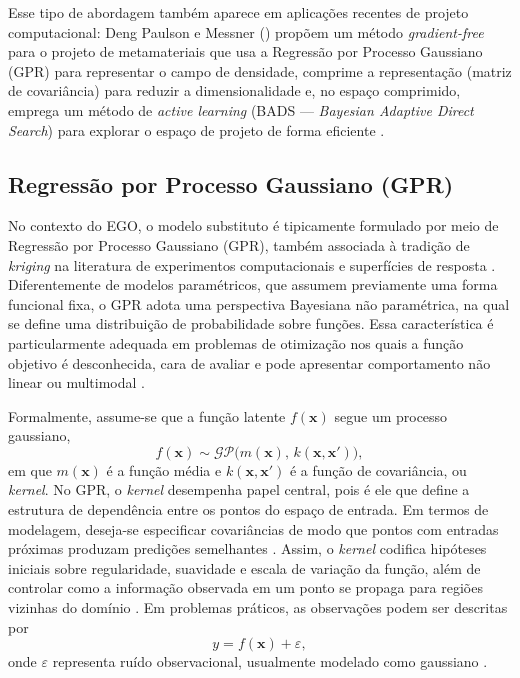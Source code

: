 Esse tipo de abordagem também aparece em aplicações recentes de projeto computacional: Deng Paulson e Messner (\cite{Deng2026_MetamaterialAL}) propõem um método \textit{gradient-free} para o projeto de metamateriais que usa a Regressão por Processo Gaussiano (GPR) para representar o campo de densidade, comprime a representação (matriz de covariância) para reduzir a dimensionalidade e, no espaço comprimido, emprega um método de \textit{active learning} (BADS — \textit{Bayesian Adaptive Direct Search}) para explorar o espaço de projeto de forma eficiente \cite{Deng2026_MetamaterialAL}.

\subsection{Regressão por Processo Gaussiano (GPR)}


No contexto do EGO, o modelo substituto é tipicamente formulado por meio de Regressão por Processo Gaussiano (GPR), também associada à tradição de \textit{kriging} na literatura de experimentos computacionais e superfícies de resposta \cite{Jones1998,Shahriari2016}. Diferentemente de modelos paramétricos, que assumem previamente uma forma funcional fixa, o GPR adota uma perspectiva Bayesiana não paramétrica, na qual se define uma distribuição de probabilidade sobre funções. Essa característica é particularmente adequada em problemas de otimização nos quais a função objetivo é desconhecida, cara de avaliar e pode apresentar comportamento não linear ou multimodal \cite{NIPS1995_7cce53cf,SCHULZ20181,Shahriari2016}.

Formalmente, assume-se que a função latente \(f(\mathbf{x})\) segue um processo gaussiano,
\begin{equation}
    f(\mathbf{x}) \sim \mathcal{GP}\!\big(m(\mathbf{x}),\,k(\mathbf{x},\mathbf{x}')\big),
\end{equation}
em que \(m(\mathbf{x})\) é a função média e \(k(\mathbf{x},\mathbf{x}')\) é a função de covariância, ou \textit{kernel}. No GPR, o \textit{kernel} desempenha papel central, pois é ele que define a estrutura de dependência entre os pontos do espaço de entrada. Em termos de modelagem, deseja-se especificar covariâncias de modo que pontos com entradas próximas produzam predições semelhantes \cite{NIPS1995_7cce53cf}. Assim, o \textit{kernel} codifica hipóteses iniciais sobre regularidade, suavidade e escala de variação da função, além de controlar como a informação observada em um ponto se propaga para regiões vizinhas do domínio \cite{NIPS1995_7cce53cf,SCHULZ20181}. Em problemas práticos, as observações podem ser descritas por
\begin{equation}
    y = f(\mathbf{x}) + \varepsilon,
\end{equation}
onde \(\varepsilon\) representa ruído observacional, usualmente modelado como gaussiano \cite{SCHULZ20181,Shahriari2016}.

